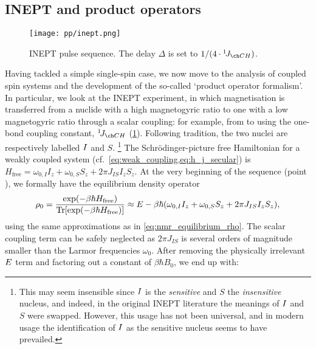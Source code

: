 \subsection{INEPT and product operators}
\label{subsec:theory__inept}

\begin{figure}[htbp]
    \centering
    \texttt{[image: pp/inept.png]}%
    \caption[INEPT pulse sequence]{
        INEPT pulse sequence.
        The delay $\Delta$ is set to $1/(4 \cdot \oneJ{CH})$.
    }
    \label{fig:inept}
\end{figure}

Having tackled a simple single-spin case, we now move to the analysis of coupled spin systems and the development of the so-called `product operator formalism'.\autocite{Sorensen1984PNMRS}
In particular, we look at the INEPT experiment\autocite{Morris1979JACS,Morris1980JACS}, in which magnetisation is transferred from a nuclide with a high magnetogyric ratio to one with a low magnetogyric ratio through a scalar coupling: for example, from \proton{} to \carbon{} using the one-bond coupling constant, $\oneJ{CH}$ (\cref{fig:inept}).
Following tradition, the two nuclei are respectively labelled $I\/$ and $S$.%
\footnote{This may seem insensible since $I\/$ is the \textit{sensitive} and $S$ the \textit{insensitive} nucleus, and indeed, in the original INEPT literature\autocite{Morris1979JACS} the meanings of $I\/$ and $S$ were swapped. However, this usage has not been universal\autocite{Pines1972JCP}, and in modern usage the identification of $I\/$ as the sensitive nucleus seems to have prevailed.}
The Schr\"odinger-picture free Hamiltonian for a weakly coupled system (cf.\ \cref{eq:weak_coupling,eq:h_j_secular}) is $H_\text{free} = \omega_{0,I} I_z + \omega_{0,S} S_z + 2\pi J_{IS} I_z S_z$.
At the very beginning of the sequence (point ), we formally have the equilibrium density operator
\begin{equation}
    \label{eq:density_eqm_heteronuclear_full}
    \rho_0 = \frac{\exp(-\beta\hbar H_\text{free})}{\operatorname{Tr}[\exp(-\beta\hbar H_\text{free})]}
    \approx E - \beta\hbar (\omega_{0,I} I_z + \omega_{0,S} S_z + 2\pi J_{IS} I_z S_z),
\end{equation}
using the same approximations as in \cref{eq:nmr_equilibrium_rho}.
The scalar coupling term can be safely neglected as $2\pi J_{IS}$ is several orders of magnitude smaller than the Larmor frequencies $\omega_0$.
After removing the physically irrelevant $E\/$ term and factoring out a constant of $\beta\hbar B_0$, we end up with:
